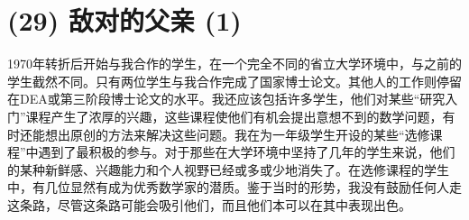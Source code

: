 \section{(29) 敌对的父亲 (1)}

1970年转折后开始与我合作的学生，在一个完全不同的省立大学环境中，与之前的学生截然不同。只有两位学生与我合作完成了国家博士论文。其他人的工作则停留在DEA或第三阶段博士论文的水平。我还应该包括许多学生，他们对某些``研究入门''课程产生了浓厚的兴趣，这些课程使他们有机会提出意想不到的数学问题，有时还能想出原创的方法来解决这些问题。我在为一年级学生开设的某些``选修课程''中遇到了最积极的参与。对于那些在大学环境中坚持了几年的学生来说，他们的某种新鲜感、兴趣能力和个人视野已经或多或少地消失了。在选修课程的学生中，有几位显然有成为优秀数学家的潜质。鉴于当时的形势，我没有鼓励任何人走这条路，尽管这条路可能会吸引他们，而且他们本可以在其中表现出色。

